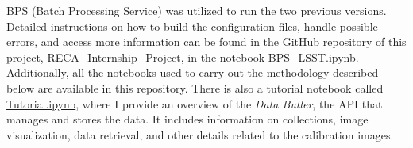 BPS (Batch Processing Service) was utilized to run the two previous versions. Detailed instructions on how to build the configuration files, handle possible errors, and access more information can be found in the GitHub repository of this project, \href{https://github.com/linagiraldom/RECA_Internship_Project}{RECA\_Internship\_Project}, in the notebook \href{https://github.com/linagiraldom/RECA_Internship_Project/blob/main/Notebooks/BPS_LSST.ipynb}{BPS\_LSST.ipynb}. Additionally, all the notebooks used to carry out the methodology described below are available in this repository. There is also a tutorial notebook called \href{https://github.com/linagiraldom/RECA_Internship_Project/blob/main/Notebooks/Tutorial.ipynb}{Tutorial.ipynb}, where I provide an overview of the \textit{Data Butler}, the API that manages and stores the data. It includes information on collections, image visualization, data retrieval, and other details related to the calibration images.


